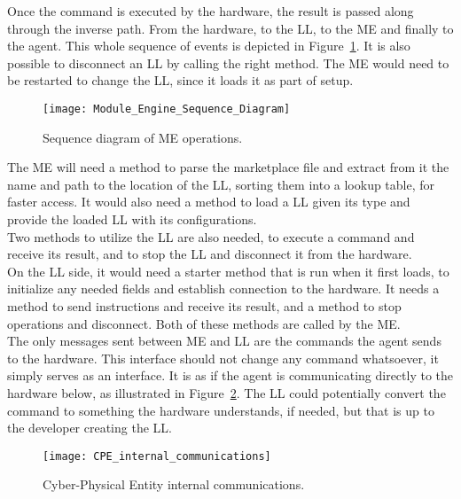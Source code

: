 Once the command is executed by the hardware, the result is passed along through the inverse path. From the hardware, to the \acrlong{LL}, to the \acrlong{ME} and finally to the agent. This whole sequence of events is depicted in Figure~\ref{fig:module_engine_sequence_diagram}. It is also possible to disconnect an \acrshort{LL} by calling the right method. The \acrshort{ME} would need to be restarted to change the \acrshort{LL}, since it loads it as part of setup.\\

\begin{figure}[h!]
	\centering
	\texttt{[image: Module\_Engine\_Sequence\_Diagram]}
	\caption{Sequence diagram of \acrlong{ME} operations.}
	\label{fig:module_engine_sequence_diagram}
\end{figure}

The \acrshort{ME} will need a method to parse the marketplace file and extract from it the name and path to the location of the \acrshort{LL}, sorting them into a lookup table, for faster access. It would also need a method to load a \acrlong{LL} given its type and provide the loaded \acrshort{LL} with its configurations.\\

Two methods to utilize the \acrshort{LL} are also needed, to execute a command and receive its result, and to stop the \acrshort{LL} and disconnect it from the hardware.\\

On the \acrlong{LL} side, it would need a starter method that is run when it first loads, to initialize any needed fields and establish connection to the hardware. It needs a method to send instructions and receive its result, and a method to stop operations and disconnect. Both of these methods are called by the \acrshort{ME}.\\

The only messages sent between \acrshort{ME} and \acrshort{LL} are the commands the agent sends to the hardware. This interface should not change any command whatsoever, it simply serves as an interface. It is as if the agent is communicating directly to the hardware below, as illustrated in Figure~\ref{fig:cpe_internal_communications}. The \acrshort{LL} could potentially convert the command to something the hardware understands, if needed, but that is up to the developer creating the \acrlong{LL}. 

\begin{figure}[h!]
	\centering
	\texttt{[image: CPE\_internal\_communications]}
	\caption{Cyber-Physical Entity internal communications.}
	\label{fig:cpe_internal_communications}
\end{figure}

